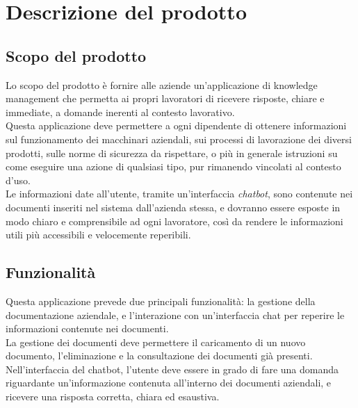 \chapter{Descrizione del prodotto} \label{cap:descr}
\section{Scopo del prodotto}
Lo scopo del prodotto è fornire alle aziende un’applicazione di knowledge management che permetta ai propri lavoratori di ricevere risposte, chiare e immediate, a domande inerenti al contesto lavorativo.\\
Questa applicazione deve permettere a ogni dipendente di ottenere informazioni sul funzionamento dei macchinari aziendali, sui processi di lavorazione dei diversi prodotti, sulle norme di sicurezza da rispettare, o più in generale istruzioni su come eseguire una azione di qualsiasi tipo, pur rimanendo vincolati al contesto d’uso.\\
Le informazioni date all'utente, tramite un’interfaccia \textit{chatbot}, sono contenute nei documenti inseriti nel sistema dall’azienda stessa, e dovranno essere esposte in modo chiaro e comprensibile ad ogni lavoratore, così da rendere le informazioni utili più accessibili e velocemente reperibili.


\section{Funzionalità}
Questa applicazione prevede due principali funzionalità: la gestione della documentazione aziendale, e l’interazione con un’interfaccia chat per reperire le informazioni contenute nei documenti.\\
La gestione dei documenti deve permettere il caricamento di un nuovo documento, l’eliminazione e la consultazione dei documenti già presenti.\\
Nell’interfaccia del chatbot, l’utente deve essere in grado di fare una domanda riguardante un’informazione contenuta all’interno dei documenti aziendali, e ricevere una risposta corretta, chiara ed esaustiva.


